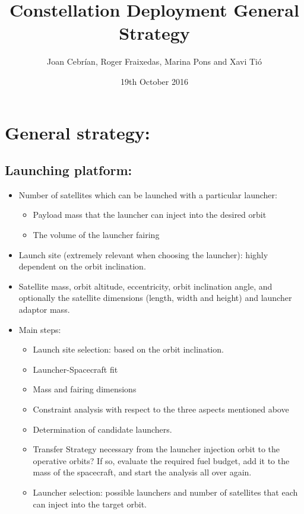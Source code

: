 \documentclass{article}
\title{Constellation Deployment General Strategy}
\author{Joan Cebr\'ian, Roger Fraixedas, Marina Pons and Xavi Ti\'o}
\date{19th October 2016}
\begin{document}
   \maketitle

\section{General strategy:}

\subsection{Launching platform: }

\begin{itemize} 

\item Number of satellites which can be launched with a particular launcher:
	\begin{itemize} 
	\item Payload mass that the launcher can inject into      the desired orbit
    \item The volume of the launcher fairing
    \end{itemize}
\item Launch site (extremely relevant when choosing the launcher): highly dependent on the orbit inclination.					
\item Satellite mass, orbit altitude, eccentricity, orbit inclination angle, and optionally the satellite dimensions (length, width and height) and launcher adaptor mass.  
\item Main steps:
    \begin{itemize}
	\item Launch site selection: based on the orbit inclination.
    \item Launcher-Spacecraft fit
    \item Mass and fairing dimensions 
    \item Constraint analysis with respect to the three aspects mentioned above
    \item Determination of candidate launchers.			
    \item Transfer Strategy necessary from the launcher injection orbit to the operative orbits? If so, evaluate the required fuel budget, add it to the mass of the spacecraft, and start the analysis all over again. 
    \item Launcher selection: possible launchers and number of satellites that each can inject into the target orbit.
    \end{itemize}

\end{itemize}
\end{document}
